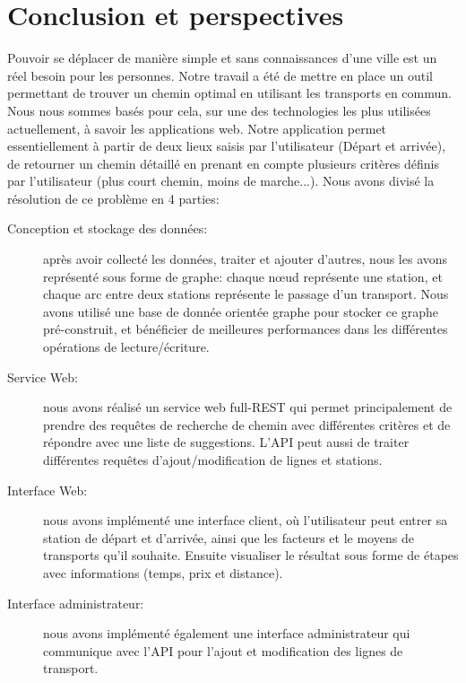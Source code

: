 \chapter{Conclusion et perspectives}

Pouvoir se déplacer de manière simple et sans connaissances d'une ville est un réel besoin pour les personnes. Notre travail a été de mettre en place un outil permettant de trouver un chemin optimal en utilisant les transports en commun.
Nous nous sommes basés pour cela, sur une des technologies les plus utilisées actuellement, à savoir les applications web.\newline
Notre application permet essentiellement à partir de deux lieux saisis par l'utilisateur (Départ et arrivée), de retourner un chemin détaillé en prenant en compte plusieurs critères définis par l'utilisateur (plus court chemin, moins de marche...).\newline
Nous avons divisé la résolution de ce problème en 4 parties:

\begin{description}
\item[Conception et stockage des données:] après avoir collecté les données, traiter et ajouter d'autres, nous les avons représenté sous forme de graphe: chaque nœud représente une station, et chaque arc entre deux stations représente le passage d'un transport.\newline
Nous avons utilisé une base de donnée orientée graphe pour stocker ce graphe pré-construit, et bénéficier de meilleures performances dans les différentes opérations de lecture/écriture.
\item[Service Web:] nous avons réalisé un service web full-REST qui permet principalement de prendre des requêtes de recherche de chemin avec différentes critères et de répondre avec une liste de suggestions. L'API peut aussi de traiter différentes requêtes d'ajout/modification de lignes et stations.
\item[Interface Web:]  nous avons implémenté une interface client, où l'utilisateur peut entrer sa station de départ et d'arrivée, ainsi que les facteurs et le moyens de transports qu'il souhaite.
Ensuite visualiser le résultat sous forme de étapes avec informations (temps, prix et distance).

\item[Interface administrateur:] nous avons implémenté également une interface administrateur qui communique avec l'API pour l'ajout et modification des lignes de transport.

\end{description}


